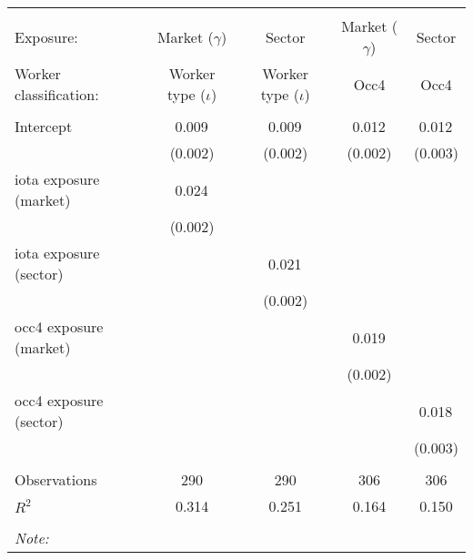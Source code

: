 \begin{tabular}{@{\extracolsep{5pt}}lcccc}
\\[-1.8ex]\hline
\hline \\[-1.8ex]
\hline \\[-1.8ex]
 Exposure: & Market ($\gamma$) & Sector & Market ($\gamma$) & Sector \\
 Worker classification: & Worker type ($\iota$) & Worker type ($\iota$) & Occ4 & Occ4 \\
 \hline &  &  &  &  \\
 Intercept & 0.009$^{}$ & 0.009$^{}$ & 0.012$^{}$ & 0.012$^{}$ \\
  & (0.002) & (0.002) & (0.002) & (0.003) \\
 iota exposure (market) & 0.024$^{}$ & & & \\
  & (0.002) & & & \\
 iota exposure (sector) & & 0.021$^{}$ & & \\
  & & (0.002) & & \\
 occ4 exposure (market) & & & 0.019$^{}$ & \\
  & & & (0.002) & \\
 occ4 exposure (sector) & & & & 0.018$^{}$ \\
  & & & & (0.003) \\
\hline \\[-1.8ex]
 Observations & 290 & 290 & 306 & 306 \\
 $R^2$ & 0.314 & 0.251 & 0.164 & 0.150 \\
\hline
\hline \\[-1.8ex]
\textit{Note:}\end{tabular}